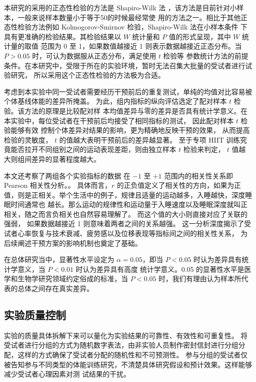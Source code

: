 \documentclass[a4paper,12pt]{article}
\begin{document}
本研究的采用的正态性检验的方法是 Shapiro-Wilk 法 \cite{li2009} ，该方法是目前针对小样本，一般来说样本数量小于等于50的时候最经常使
用的方法之一。相比于其他正态性检验方法例如 Kolmogorov-Smirnov 检验，Shapiro-Wilk 法在小样本条件
下具有更准确的检验结果。其检验结果以 $W$ 统计量和 $P$ 值的形式呈现，其中 $W$ 统计量的取值
范围为 0 至 1，如果数值越接近 1 则表示数据越接近正态分布。当 $P>0.05$ 时，可认为数据服从正态分布，满足使用 $t$ 检验等
参数统计方法的前提条件。在本研究中，受限于所在的实验环境，暂时无法召集大批量的受试者进行试验研究，
所以采用这个正态性检验的方法极为合适。

考虑到本实验中同一受试者需要经历干预前后的重复测试，单纯的均值对比容易被个体基线体能的差异所掩盖。
为此，组内指标的纵向评估选定了配对样本 $t$ 检验。该方法的原理是比较配对样
本均值差异与零的差异是否具有统计学意义\cite{ma2017}。在本实验中，每位受试者在干预前后均接受了相同指标的测试，
因此配对样本 $t$ 检验能够有效
控制个体差异对结果的影响，更为精确地反映干预的效果，
从而提高检验的灵敏度， $t$ 的值越大表明干预前后的差异越显著。
至于专项 HIIT 训练究竟能否拉开不同组别之间的运动表现差距，则由独立样本 $t$ 检验来判定， $t$ 值越大则组间差异的显著程度越大\cite{shen2007}。

本文还考察了两组各个实验指标的数据
在 $-1$ 至 $+1$ 范围内的相关性关系即Pearson 相关性分析。\cite{sun2018}。
具体而言，$r$ 的正负值定义了相关性的方向，如果为正值，则是正相关。举个生活中的例子，规律且适量的运动越多，入睡越快，深度睡眠时间通常也
越长。那么运动的规律性和运动量于入睡速度以及睡眠深度就叫正相关，随之而言负相关也自然容易理解了。
而这个值的大小则直接对应了关联的强弱，
如果数据越接近 1 则意味着两者之间的关系越强。
这一分析深度揭示了受试者心率恢复与技术衰减、疲劳感以及位移表现等指标间之间的相关性关系，
为后续阐述干预方案的影响机制也奠定了基础。

在总体研究当中，显著性水平设定为 $\alpha=0.05$，即当 $P<0.05$ 时认为差异具有统计学意义，当 $P<0.01$ 时认为差异具有高度
统计学意义。0.05 的显著性水平是医学和生物学研究领域约定俗成的标准，当 $P<0.05$ 时，我们有理由认为样本所代表的总体之间存在真实差异。



\subsection{实验质量控制}

实验的质量具体拆解下来可以量化为实验结果的可靠性、有效性和可重复性。
将受试者进行分组的方式为随机数字表法，由非实验人员制作密封信封进行分组分配，这样的方式确保了受试者分配的随机性和不可预测性。
参与分组的受试者仅被告知参与不同类型的体能训练研究，不清楚具体研究假设和预计效果。这样能够减少受试者心理因素对测
试结果的干扰。
\end{document}
